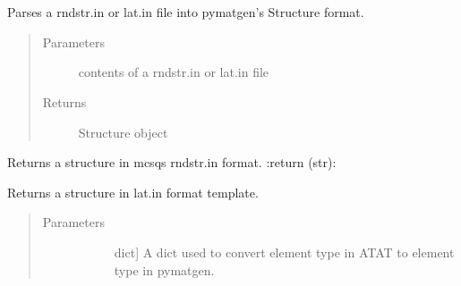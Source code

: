 \documentclass[letterpaper,10pt,english]{sphinxmanual}
\begin{document}
\begin{fulllineitems}
\label{\detokenize{pygace:pygace.parse.GaceMcsqs}}~

\begin{fulllineitems}
\label{\detokenize{pygace:pygace.parse.GaceMcsqs.nb_occu_sites}}~
\end{fulllineitems}


\begin{fulllineitems}
\label{\detokenize{pygace:pygace.parse.GaceMcsqs.structure_from_string}}
Parses a rndstr.in or lat.in file into pymatgen’s
Structure format.
\begin{quote}\begin{description}
\item[{Parameters}] \leavevmode
{} \textendash{} contents of a rndstr.in or lat.in file

\item[{Returns}] \leavevmode
Structure object

\end{description}\end{quote}

\end{fulllineitems}


\begin{fulllineitems}
\label{\detokenize{pygace:pygace.parse.GaceMcsqs.to_string}}
Returns a structure in mcsqs rndstr.in format.
:return (str):

\end{fulllineitems}


\begin{fulllineitems}
\label{\detokenize{pygace:pygace.parse.GaceMcsqs.to_template}}
Returns a structure in lat.in format template.
\begin{quote}\begin{description}
\item[{Parameters}] \leavevmode\begin{description}
\item[{}] \leavevmode{[}dict{]}
A dict used to convert element type in ATAT to
element type in pymatgen.


\end{description}
\end{description}
\end{quote}
\end{fulllineitems}
\end{fulllineitems}
\end{document}
